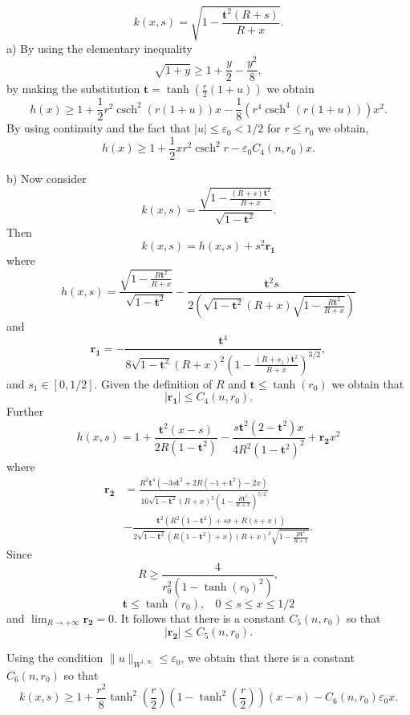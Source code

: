 \documentclass[11pt]{amsart}
\newcommand{\csch}{\operatorname{csch}}
\numberwithin{equation}{section}
\def\ge{\geqslant}
\begin{document}
 $$k(x,s)=\sqrt{1-\frac{\mathbf{t}^2 (R+s)}{R+ x}}.$$
a) By using the elementary inequality $$\sqrt{1+y}\ge 1+\frac{y}{2}-\frac{y^2}{8},$$ by making the substitution $\mathbf{t}=\tanh(\frac{r}{2}(1+u))$ we obtain
$$h(x)\ge 1+\frac{1}{2} r^2 \csch^2(r (1+u)) x-\frac{1}{8} \left(r^4 \csch^4(r (1+u))\right) x^2.$$
By using continuity and the fact that $|u|\le \varepsilon_0<1/2$ for $r\le r_0$ we obtain, \begin{equation}\label{esth}h(x) \ge 1+ \frac{1}{2} x r^2 \csch^2 r - \varepsilon_0 C_{4}(n,r_0) x.\end{equation}


b) Now consider $$k(x,s)=\frac{\sqrt{1-\frac{(R+s) \mathbf{t}^2}{R+ x}}}{\sqrt{1-\mathbf{t}^2}}.$$
Then $$k(x,s) = h(x,s)+s^2\mathbf{r_1}$$
where $$ h(x,s)=\frac{\sqrt{1-\frac{R \mathbf{t}^2}{R+x}}}{\sqrt{1-\mathbf{t}^2}}-\frac{\mathbf{t}^2 s}{2 \left(\sqrt{1-\mathbf{t}^2} (R+x) \sqrt{1-\frac{R \mathbf{t}^2}{R+x}}\right)}$$ and $$\mathbf{r_1}=-\frac{\mathbf{t}^4}{8 \sqrt{1-\mathbf{t}^2} (R+x)^2 \left(1-\frac{(R+s_1) \mathbf{t}^2}{R+x}\right)^{3/2}},$$ and $s_1\in [0,1/2]$. Given the definition of $R$ and $\mathbf{t}\le \tanh(r_0)$ we obtain that  $$|\mathbf{r_1}|\le C_4(n,r_0).$$ Further $$h(x,s)= 1+\frac{\mathbf{t}^2 (x-s)}{2 R \left(1-\mathbf{t}^2\right)}-\frac{s \mathbf{t}^2 \left(2-\mathbf{t}^2\right) x}{4 R^2 \left(1-\mathbf{t}^2\right)^2}+ \mathbf{r_2} x^2 $$ where \[\begin{split}\mathbf{r_2}&=\frac{R^2 \mathbf{t}^4 \left(-3 s \mathbf{t}^2+2 R \left(-1+\mathbf{t}^2\right)-2 x\right)}{16 \sqrt{1-\mathbf{t}^2} (R+x)^5 \left(1-\frac{R \mathbf{t}^2}{R+x}\right)^{5/2}}
\\&- \frac{\mathbf{t}^2 \left(R^2 \left(1-\mathbf{t}^2\right)+s x+R (s+x)\right)}{2\sqrt{1-\mathbf{t}^2} \left(R \left(1-\mathbf{t}^2\right)+x\right) (R+x)^3 \sqrt{1-\frac{R \mathbf{t}^2}{R+x}}}.\end{split}\] Since $$R\ge \frac{4}{r_0^2(1-\tanh(r_0)^2)}, $$  $$\mathbf{t}\le \tanh(r_0),\ \ \ \ 0\le s\le x\le 1/2$$ and $\lim_{R\to  +\infty } \mathbf{r_2}=0$. It follows that there is a constant $C_5(n,r_0)$ so that   $$|\mathbf{r_2}|\le C_5(n,r_0).$$

Using the condition $\|u\|_{W^{1,\infty}}\le \varepsilon_0$, we obtain that there is a constant $C_6(n,r_0)$ so that
\begin{equation}\label{kxs}
k(x,s)\ge 1+ \frac{r^2}{8}  \tanh^2(\frac{r}{2})\left(1-\tanh^2(\frac{r}{2})\right)(x-s) - C_6(n,r_0)\varepsilon_0 x.\end{equation}
\end{document}
